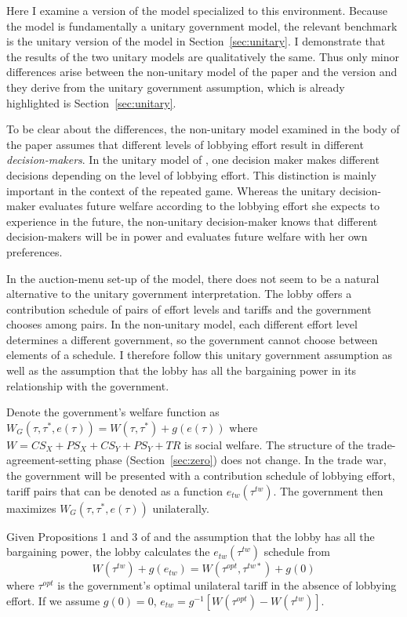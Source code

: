\documentclass[authoryear, review]{elsarticle}
\begin{document}
Here I examine a version of the \citet{dgh97} model specialized to this environment. Because the \citet{dgh97} model is fundamentally a unitary government model, the relevant benchmark is the unitary version of the model in Section~\ref{sec:unitary}. I demonstrate that the results of the two unitary models are qualitatively the same. Thus only minor differences arise between the non-unitary model of the paper and the \citet{dgh97} version and they derive from the unitary government assumption, which is already highlighted is Section~\ref{sec:unitary}.

To be clear about the differences, the non-unitary model examined in the body of the paper assumes that different levels of lobbying effort result in different \textit{decision-makers}. In the unitary model of \citet{dgh97}, one decision maker makes different decisions depending on the level of lobbying effort. This distinction is mainly important in the context of the repeated game. Whereas the unitary decision-maker evaluates future welfare according to the lobbying effort she expects to experience in the future, the non-unitary decision-maker knows that different decision-makers will be in power and evaluates future welfare with her own preferences.

In the auction-menu set-up of the \citet{dgh97} model, there does not seem to be a natural alternative to the unitary government interpretation. The lobby offers a contribution schedule of pairs of effort levels and tariffs and the government chooses among pairs. In the non-unitary model, each different effort level determines a different government, so the government cannot choose between elements of a schedule. I therefore follow this unitary government assumption as well as the assumption that the lobby has all the bargaining power in its relationship with the government.

Denote the government's welfare function as $W_G(\tau,\tau^*,e(\tau)) = W(\tau,\tau^*) + g(e(\tau))$ where $W = CS_X + PS_X + CS_Y + PS_Y +TR$ is social welfare. The structure of the trade-agreement-setting phase (Section~\ref{sec:zero}) does not change. In the trade war, the government will be presented with a contribution schedule of lobbying effort, tariff pairs that can be denoted as a function $e_{tw}(\tau^{tw})$. The government then maximizes $W_G(\tau,\tau^*,e(\tau))$ unilaterally.

Given Propositions 1 and 3 of \citet{dgh97} and the assumption that the lobby has all the bargaining power, the lobby calculates the $e_{tw}\left(\tau^{tw}\right)$ schedule from 
\begin{equation}
  W(\tau^{tw}) +g(e_{tw}) = W(\tau^{opt},\tau^{tw*}) +g(0)
	\label{eq:dgh}
\end{equation}
where $\tau^{opt}$ is the government's optimal unilateral tariff in the absence of lobbying effort. If we assume $g(0) = 0$, $e_{tw} = g^{-1}\left[W(\tau^{opt}) - W(\tau^{tw})\right]$.
								
\end{document}

